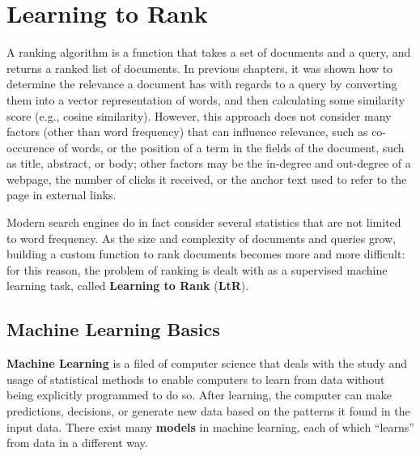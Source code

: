 \chapter{Learning to Rank}

A ranking algorithm is a function that takes a set of documents and a query, and returns a ranked list of documents. In previous chapters, it was shown how to determine the relevance a document has with regards to a query by converting them into a vector representation of words, and then calculating some similarity score (e.g., cosine similarity). However, this approach does not consider many factors (other than word frequency) that can influence relevance, such as co-occurence of words, or the position of a term in the fields of the document, such as title, abstract, or body; other factors may be the in-degree and out-degree of a webpage, the number of clicks it received, or the anchor text used to refer to the page in external links.

Modern search engines do in fact consider several statistics that are not limited to word frequency. As the size and complexity of documents and queries grow, building a custom function to rank documents becomes more and more difficult: for this reason, the problem of ranking is dealt with as a supervised machine learning task, called \textbf{Learning to Rank} (\textbf{LtR}).

\section{Machine Learning Basics}

\textbf{Machine Learning} is a filed of computer science that deals with the study and usage of statistical methods to enable computers to learn from data without being explicitly programmed to do so. After learning, the computer can make predictions, decisions, or generate new data based on the patterns it found in the input data. There exist many \textbf{models} in machine learning, each of which ``learns'' from data in a different way. 

